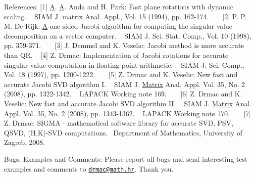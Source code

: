\begin{DoxyParagraph}{References\+: }
\mbox{[}1\mbox{]} \hyperlink{classA}{A}. \hyperlink{classA}{A}. Anda and H. Park\+: Fast plane rotations with dynamic scaling. ~\newline
 S\+I\+A\+M J. matrix Anal. Appl., Vol. 15 (1994), pp. 162-\/174. ~\newline
~\newline
 \mbox{[}2\mbox{]} P. P. M. De Rijk\+: \hyperlink{classA}{A} one-\/sided Jacobi algorithm for computing the singular value decomposition on a vector computer. ~\newline
 S\+I\+A\+M J. Sci. Stat. Comp., Vol. 10 (1998), pp. 359-\/371. ~\newline
~\newline
 \mbox{[}3\mbox{]} J. Demmel and K. Veselic\+: Jacobi method is more accurate than Q\+R. ~\newline
 \mbox{[}4\mbox{]} Z. Drmac\+: Implementation of Jacobi rotations for accurate singular value computation in floating point arithmetic. ~\newline
 S\+I\+A\+M J. Sci. Comp., Vol. 18 (1997), pp. 1200-\/1222. ~\newline
~\newline
 \mbox{[}5\mbox{]} Z. Drmac and K. Veselic\+: New fast and accurate Jacobi S\+V\+D algorithm I. ~\newline
 S\+I\+A\+M J. \hyperlink{classMatrix}{Matrix} Anal. Appl. Vol. 35, No. 2 (2008), pp. 1322-\/1342. ~\newline
 L\+A\+P\+A\+C\+K Working note 169. ~\newline
~\newline
 \mbox{[}6\mbox{]} Z. Drmac and K. Veselic\+: New fast and accurate Jacobi S\+V\+D algorithm I\+I. ~\newline
 S\+I\+A\+M J. \hyperlink{classMatrix}{Matrix} Anal. Appl. Vol. 35, No. 2 (2008), pp. 1343-\/1362. ~\newline
 L\+A\+P\+A\+C\+K Working note 170. ~\newline
~\newline
 \mbox{[}7\mbox{]} Z. Drmac\+: S\+I\+G\+M\+A -\/ mathematical software library for accurate S\+V\+D, P\+S\+V, Q\+S\+V\+D, (H,K)-\/\+S\+V\+D computations.~\newline
 Department of Mathematics, University of Zagreb, 2008.
\end{DoxyParagraph}
\begin{DoxyParagraph}{Bugs, Examples and Comments\+: }
Please report all bugs and send interesting test examples and comments to \href{mailto:drmac@math.hr}{\tt drmac@math.\+hr}. Thank you. 
\end{DoxyParagraph}
\hypertarget{group__realGEcomputational_gab9b698b35b884b4d17b9713e76fabe37}{}
